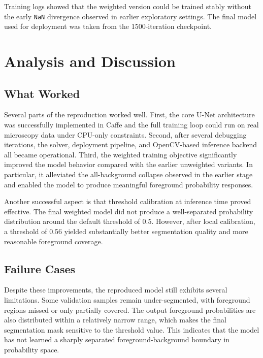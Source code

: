 \documentclass[11pt]{article}
\begin{document}
Training logs showed that the weighted version could be trained stably without the early \texttt{NaN} divergence observed in earlier exploratory settings. The final model used for deployment was taken from the 1500-iteration checkpoint.

\section{Analysis and Discussion}

\subsection{What Worked}

Several parts of the reproduction worked well. First, the core U-Net architecture was successfully implemented in Caffe and the full training loop could run on real microscopy data under CPU-only constraints. Second, after several debugging iterations, the solver, deployment pipeline, and OpenCV-based inference backend all became operational. Third, the weighted training objective significantly improved the model behavior compared with the earlier unweighted variants. In particular, it alleviated the all-background collapse observed in the earlier stage and enabled the model to produce meaningful foreground probability responses.

Another successful aspect is that threshold calibration at inference time proved effective. The final weighted model did not produce a well-separated probability distribution around the default threshold of 0.5. However, after local calibration, a threshold of 0.56 yielded substantially better segmentation quality and more reasonable foreground coverage.

\subsection{Failure Cases}

Despite these improvements, the reproduced model still exhibits several limitations. Some validation samples remain under-segmented, with foreground regions missed or only partially covered. The output foreground probabilities are also distributed within a relatively narrow range, which makes the final segmentation mask sensitive to the threshold value. This indicates that the model has not learned a sharply separated foreground-background boundary in probability space.
\end{document}
